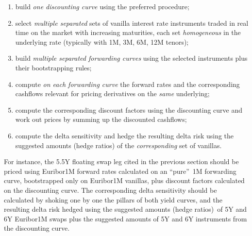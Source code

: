 \documentclass[11pt,reqno]{amsart}
\begin{document}
\begin{enumerate}
\item build \textit{one discounting curve} using the preferred procedure;

\item select \textit{multiple separated} sets of vanilla interest rate instruments traded in real time on the market with increasing maturities, each set \textit{homogeneous} in the underlying rate (typically with 1M, 3M, 6M, 12M tenors);

\item build \textit{multiple separated forwarding curves} using the selected instruments plus their bootstrapping rules;

\item compute \textit{on each forwarding curve} the forward rates and the corresponding cashflows relevant for pricing derivatives on the \textit{same} underlying;

\item compute the corresponding discount factors using the discounting curve and work out prices by summing up the discounted cashflows;

\item compute the delta sensitivity and hedge the resulting delta risk using the suggested amounts (hedge ratios) of the \textit{corresponding} set of vanillas.
\end{enumerate}

For instance, the 5.5Y floating swap leg cited in the previous section should be priced using Euribor1M forward rates calculated on an \textquotedblleft pure\textquotedblright\ 1M forwarding curve, bootstrapped only on Euribor1M vanillas, plus discount factors calculated on the discounting curve. The corresponding delta sensitivity should be calculated by shoking one by one the pillars of both yield curves, and the resulting delta risk hedged using the suggested amounts (hedge ratios)\ of 5Y and 6Y Euribor1M swaps plus the suggested amounts of 5Y and 6Y instruments from the discounting curve.
\end{document}

